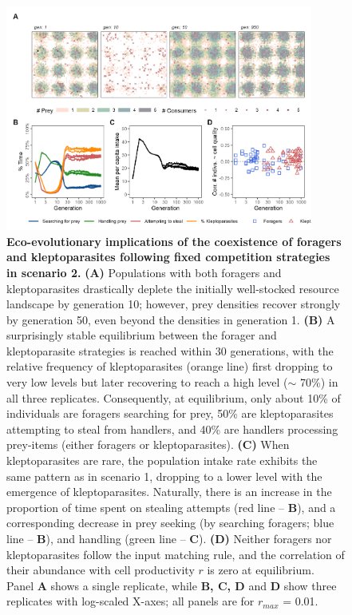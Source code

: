 \begin{refsection}[sorting=nyt]
\begin{figure}[t!]
    \centering
    \includegraphics[width=0.9\textwidth]{figures/kleptomove/fig_02.png}
    \caption{
        \textbf{Eco-evolutionary implications of the coexistence of foragers and kleptoparasites following fixed competition strategies in scenario 2.}
        \textbf{(A)} Populations with both foragers and kleptoparasites drastically deplete the initially well-stocked resource landscape by generation 10; however, prey densities recover strongly by generation 50, even beyond the densities in generation 1.
        \textbf{(B)} A surprisingly stable equilibrium between the forager and kleptoparasite strategies is reached within 30 generations, with the relative frequency of kleptoparasites (orange line) first dropping to very low levels but later recovering to reach a high level ($\sim$ 70\%) in all three replicates.
        Consequently, at equilibrium, only about 10\% of individuals are foragers searching for prey, 50\% are kleptoparasites attempting to steal from handlers, and 40\% are handlers processing prey-items (either foragers or kleptoparasites). 
        \textbf{(C)} When kleptoparasites are rare, the population intake rate exhibits the same pattern as in scenario 1, dropping to a lower level with the emergence of kleptoparasites.
        Naturally, there is an increase in the proportion of time spent on stealing attempts (red line -- \textbf{B}), and a corresponding decrease in prey seeking (by searching foragers; blue line -- \textbf{B}), and handling (green line -- \textbf{C}).
        \textbf{(D)} Neither foragers nor kleptoparasites follow the input matching rule, and the correlation of their abundance with cell productivity $r$ is zero at equilibrium.
        Panel \textbf{A} shows a single replicate, while \textbf{B, C, D} and \textbf{D} show three replicates with log-scaled X-axes; all panels are for $r_{max}$ = 0.01.
    }
    \label{fig2}
\end{figure}


\end{refsection}
